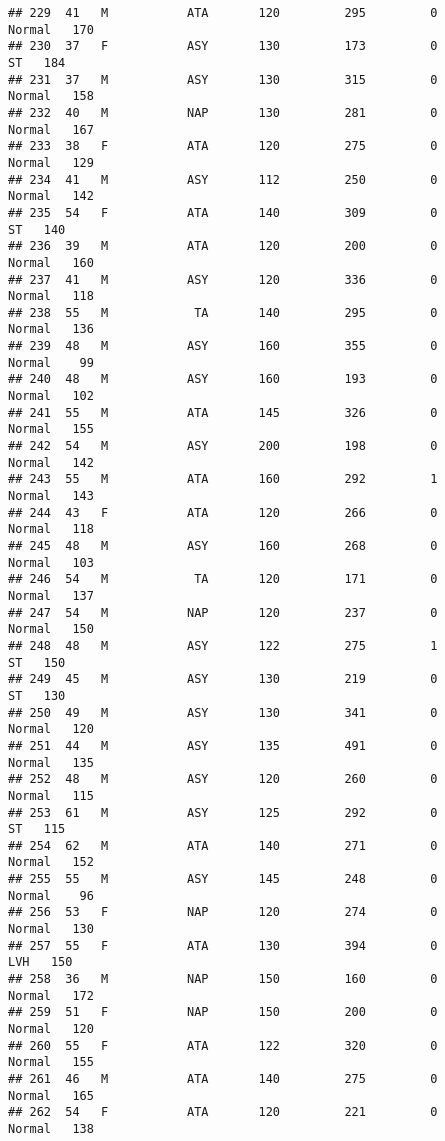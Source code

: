 \documentclass[
]{article}
\begin{document}
\begin{verbatim}
## 229  41   M           ATA       120         295         0     Normal   170
## 230  37   F           ASY       130         173         0         ST   184
## 231  37   M           ASY       130         315         0     Normal   158
## 232  40   M           NAP       130         281         0     Normal   167
## 233  38   F           ATA       120         275         0     Normal   129
## 234  41   M           ASY       112         250         0     Normal   142
## 235  54   F           ATA       140         309         0         ST   140
## 236  39   M           ATA       120         200         0     Normal   160
## 237  41   M           ASY       120         336         0     Normal   118
## 238  55   M            TA       140         295         0     Normal   136
## 239  48   M           ASY       160         355         0     Normal    99
## 240  48   M           ASY       160         193         0     Normal   102
## 241  55   M           ATA       145         326         0     Normal   155
## 242  54   M           ASY       200         198         0     Normal   142
## 243  55   M           ATA       160         292         1     Normal   143
## 244  43   F           ATA       120         266         0     Normal   118
## 245  48   M           ASY       160         268         0     Normal   103
## 246  54   M            TA       120         171         0     Normal   137
## 247  54   M           NAP       120         237         0     Normal   150
## 248  48   M           ASY       122         275         1         ST   150
## 249  45   M           ASY       130         219         0         ST   130
## 250  49   M           ASY       130         341         0     Normal   120
## 251  44   M           ASY       135         491         0     Normal   135
## 252  48   M           ASY       120         260         0     Normal   115
## 253  61   M           ASY       125         292         0         ST   115
## 254  62   M           ATA       140         271         0     Normal   152
## 255  55   M           ASY       145         248         0     Normal    96
## 256  53   F           NAP       120         274         0     Normal   130
## 257  55   F           ATA       130         394         0        LVH   150
## 258  36   M           NAP       150         160         0     Normal   172
## 259  51   F           NAP       150         200         0     Normal   120
## 260  55   F           ATA       122         320         0     Normal   155
## 261  46   M           ATA       140         275         0     Normal   165
## 262  54   F           ATA       120         221         0     Normal   138

\end{verbatim}
\end{document}

